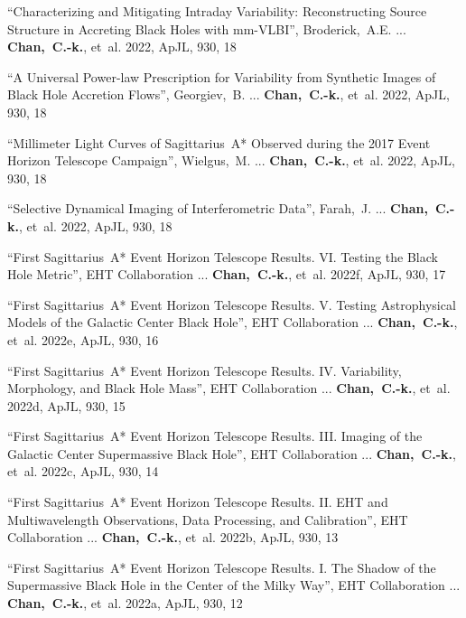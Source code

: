\begin{ilist}
\item ``Characterizing and Mitigating Intraday Variability: Reconstructing Source Structure in Accreting Black Holes with mm-VLBI'',
  Broderick,~A.E. ... \textbf{Chan,~C.-k.}, et~al.
  2022, ApJL, 930, 18

\item ``A Universal Power-law Prescription for Variability from Synthetic Images of Black Hole Accretion Flows'',
  Georgiev,~B. ... \textbf{Chan,~C.-k.}, et~al.
  2022, ApJL, 930, 18

\item ``Millimeter Light Curves of Sagittarius~A* Observed during the 2017 Event Horizon Telescope Campaign'',
  Wielgus,~M. ... \textbf{Chan,~C.-k.}, et~al.
  2022, ApJL, 930, 18

\item ``Selective Dynamical Imaging of Interferometric Data'',
  Farah,~J. ... \textbf{Chan,~C.-k.}, et~al.
  2022, ApJL, 930, 18

\item ``First Sagittarius~A* Event Horizon Telescope Results. VI. Testing the Black Hole Metric'',
  EHT Collaboration ... \textbf{Chan,~C.-k.}, et~al.
  2022f, ApJL, 930, 17

\item ``First Sagittarius~A* Event Horizon Telescope Results. V. Testing Astrophysical Models of the Galactic Center Black Hole'',
  EHT Collaboration ... \textbf{Chan,~C.-k.}, et~al.
  2022e, ApJL, 930, 16

\item ``First Sagittarius~A* Event Horizon Telescope Results. IV. Variability, Morphology, and Black Hole Mass'',
  EHT Collaboration ... \textbf{Chan,~C.-k.}, et~al.
  2022d, ApJL, 930, 15

\item ``First Sagittarius~A* Event Horizon Telescope Results. III. Imaging of the Galactic Center Supermassive Black Hole'',
  EHT Collaboration ... \textbf{Chan,~C.-k.}, et~al.
  2022c, ApJL, 930, 14

\item ``First Sagittarius~A* Event Horizon Telescope Results. II. EHT and Multiwavelength Observations, Data Processing, and Calibration'',
  EHT Collaboration ... \textbf{Chan,~C.-k.}, et~al.
  2022b, ApJL, 930, 13

\item ``First Sagittarius~A* Event Horizon Telescope Results. I. The Shadow of the Supermassive Black Hole in the Center of the Milky Way'',
  EHT Collaboration ... \textbf{Chan,~C.-k.}, et~al.
  2022a, ApJL, 930, 12


\end{ilist}
